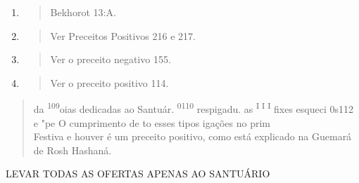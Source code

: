 \begin{enumerate}
\def\labelenumi{\arabic{enumi}.}
\setcounter{enumi}{104}
\item
 \begin{quote}
 Bekhorot 13:A.
 \end{quote}
\item
 \begin{quote}
 Ver Preceitos Positivos 216 e 217.
 \end{quote}
\item
 \begin{quote}
 Ver o preceito negativo 155.
 \end{quote}
\item
 \begin{quote}
 Ver o preceito positivo 114.
 \end{quote}
\end{enumerate}

\begin{quote}


da \textsuperscript{109}oias dedicadas ao Santuár.
\textsuperscript{0110} respigadu. as
\textsuperscript{I I I} fixes esqueci 0s112 e "pe O cumprimento de to
esses tipos igações no prim\\
Festiva e houver é um preceito positivo, como está explicado na Guemará
de Rosh Hashaná.
\end{quote}

LEVAR TODAS AS OFERTAS APENAS AO SANTUÁRIO

